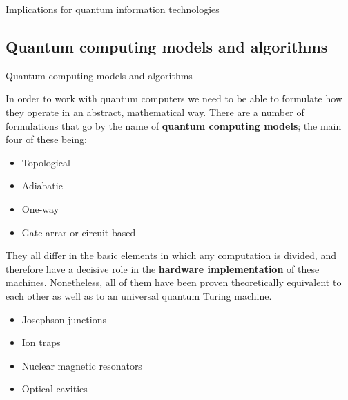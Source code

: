 \documentclass[9pt, handout, aspectratio=169]{beamer}	%
\begin{document}
\begin{frame}{Implications for quantum information technologies}
\begin{multicols}{2}
	\end{multicols}

\end{frame}


\subsection{Quantum computing models and algorithms}

\begin{frame}{Quantum computing models and algorithms}

	In order to work with quantum computers we need to be able to formulate how they operate in an abstract, mathematical way. There are a number of formulations that go by the name of \textbf{quantum computing models}; the main four of these being:

	\begin{multicols}{2}
		\begin{itemize}
			\item Topological
			\item Adiabatic
			\columnbreak
			\item One-way
			\item Gate arrar or circuit based
		\end{itemize}
	\end{multicols}

	\pause

	They all differ in the basic elements in which any computation is divided, and therefore have a decisive role in the \textbf{hardware implementation} of these machines. Nonetheless, all of them have been proven theoretically equivalent to each other as well as to an universal quantum Turing machine.

	\begin{multicols}{2}
		\begin{itemize}
			\item Josephson junctions
			\item Ion traps
			\columnbreak
			\item Nuclear magnetic resonators
			\item Optical cavities
		\end{itemize}
	\end{multicols}

\end{frame}

\end{document}
